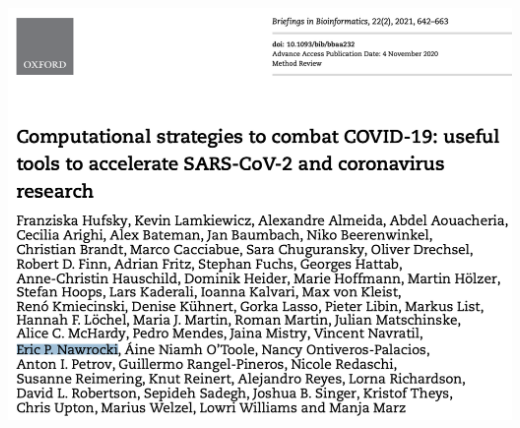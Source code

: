 \documentclass[landscape]{slides}
\begin{document}
\begin{slide}
  \begin{center}
\includegraphics[height=7.5in]{figs/paper-covid}
\end{center}

\vfill
\end{slide}
\end{document}
